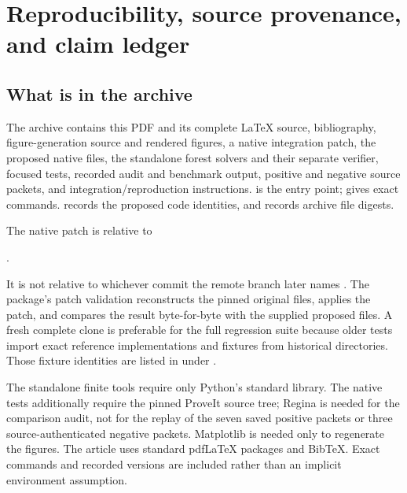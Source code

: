 \section{Reproducibility, source provenance, and claim ledger}

\subsection{What is in the archive}
The archive contains this PDF and its complete LaTeX source, bibliography,
figure-generation source and rendered figures, a native integration patch,
the proposed native files, the standalone forest solvers and their separate
verifier, focused tests, recorded audit and benchmark output, positive and
negative source packets, and integration/reproduction instructions.
 is the entry point;  gives exact
commands.   records the proposed code identities,
and  records archive file digests.

The native patch is relative to
\begin{center}\small\basecommit.\end{center}
It is not relative to whichever commit the remote branch later names
.  The package's patch validation reconstructs the pinned
original files, applies the patch, and compares the result byte-for-byte
with the supplied proposed files.  A fresh complete clone is preferable
for the full regression suite because older tests import exact reference
implementations and fixtures from historical  directories.
Those fixture identities are listed in 
under .

The standalone finite tools require only Python's standard library.
The native tests additionally require the pinned ProveIt source tree;
Regina is needed for the comparison audit, not for the replay of the seven
saved positive packets or three source-authenticated negative packets.
Matplotlib is needed only to regenerate the figures.  The article uses
standard pdfLaTeX packages and BibTeX.  Exact commands and recorded versions
are included rather than an implicit environment assumption.

